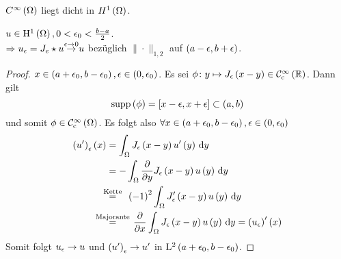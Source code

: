 \begin{lemma}[Satz]
	$C^{\infty}\left(\Omega\right)$ liegt dicht in $H^{1}\left(\Omega\right)$.
\end{lemma}
\begin{lemma}
	$u\in\mathrm{H}^{1}\left(\Omega\right), 0<\epsilon_{0}<\frac{b-a}{2}$.\\
	$\implies u_{\e} = J_{e}\star u\overset{\mathclap{\e\to 0}}{\rightarrow}u$ bezüglich $\|\cdot\|_{1,2}$ auf $\left(a-\epsilon,b+\epsilon\right)$.
\end{lemma}
\begin{proof}
	$x\in\left(a+\epsilon_{0},b-\epsilon_{0}\right), \epsilon\in\left(0,\epsilon_{0}\right)$. Es sei $\phi\colon y\mapsto J_{\epsilon}\left(x-y\right)\in\mathcal{C}^{\infty}_{\text{c}}\left(\mathbb{R}\right)$. Dann gilt
	\begin{equation*}
		\operatorname{supp}\left(\phi\right) = \left[x-\epsilon,x+\epsilon\right]\subset\left(a,b\right)
	\end{equation*}
	und somit $\phi\in\mathcal{C}^{\infty}_{\text{c}}\left(\Omega\right)$. Es folgt also $\forall x\in\left(a+\epsilon_{0},b-\epsilon_{0}\right),\epsilon\in\left(0,\epsilon_{0}\right)${}
	\begin{align*}
		\left(u^{\prime}\right)_{\e}\left(x\right) &= \int_{\W}J_{\e}\left(x-y\right)u^{\prime}\left(y\right)\d y\\
			&= -\int_{\W}\frac{\partial}{\partial y}J_{\e}\left(x-y\right)u\left(y\right)\d y\\
			&\overset{\mathclap{\text{Kette}}}{=}\hspace*{1em}\left(-1\right)^{2}\int_{\W}J^{\prime}_{\e}\left(x-y\right)u\left(y\right)\d y\\
			&\overset{\mathclap{\text{Majorante}}}{=}\hspace*{1.5em}\frac{\partial}{\partial x}\int_{\W}J_{\e}\left(x-y\right)u\left(y\right)\d y = \left(u_{\e}\right)^{\prime}\left(x\right)
	\end{align*}
	Somit folgt $u_{\epsilon}\to u$ und $\left(u^{\prime}\right)_{\epsilon}\to u^{\prime}$ in $\mathrm{L}^{2}\left(a+\epsilon_{0},b-\epsilon_{0}\right)$.
\end{proof}
